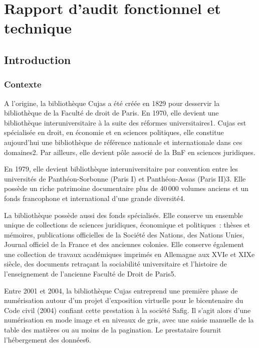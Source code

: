 \chapter{Rapport d'audit fonctionnel et technique}
\label{annexe_A_rapport_audit}

\section*{Introduction}

\subsection*{Contexte} 
A l’origine, la bibliothèque Cujas a été créée en 1829 pour desservir la bibliothèque de la Faculté de droit de Paris. En 1970, elle devient une bibliothèque interuniversitaire à la suite des réformes universitaires1. Cujas est spécialisée en droit, en économie et en sciences politiques, elle constitue aujourd’hui une bibliothèque de référence nationale et internationale dans ces domaines2. Par ailleurs, elle devient pôle associé de la BnF en sciences juridiques. 

En 1979, elle devient bibliothèque interuniversitaire par convention entre les universités de Panthéon-Sorbonne (Paris I) et Panthéon-Assas (Paris II)3. Elle possède un riche patrimoine documentaire plus de 40 000 volumes anciens et un fonds francophone et international d’une grande diversité4. 

La bibliothèque possède aussi des fonds spécialisés. Elle conserve un ensemble unique de collections de sciences juridiques, économique et politiques  : thèses et mémoires, publications officielles de la Société des Nations, des Nations Unies, Journal officiel de la France et des anciennes colonies. Elle conserve également une collection de travaux académiques imprimés en Allemagne aux XVIe et XIXe siècle, des documents retraçant la sociabilité universitaire et l’histoire de l’enseignement de l’ancienne Faculté de Droit de Paris5. 

Entre 2001 et 2004, la bibliothèque Cujas entreprend une première phase de numérisation autour d’un projet d’exposition virtuelle pour le bicentenaire du Code civil (2004) confiant cette prestation à la société Safig. Il s’agit alors d’une numérisation en mode image et en niveaux de gris, avec une saisie manuelle de la table des matières ou au moins de la pagination. Le prestataire fournit l’hébergement des données6. 




